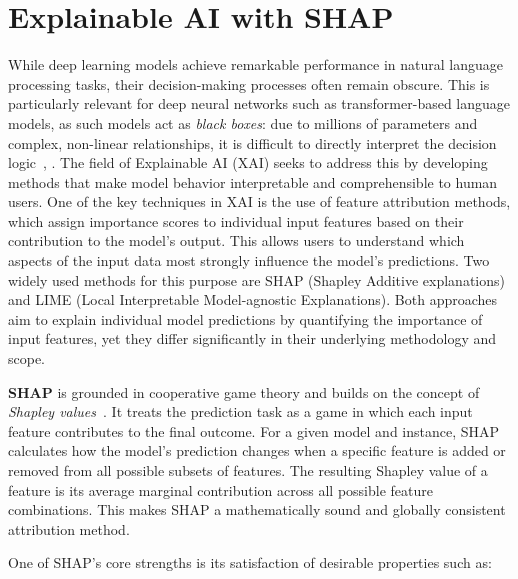 \section{Explainable AI with SHAP}

While deep learning models achieve remarkable performance in natural language processing tasks, their decision-making processes often remain obscure. This is particularly relevant for deep neural networks such as transformer-based language models, as such models act as \emph{black boxes}: due to millions of parameters and complex, non-linear relationships, it is difficult to directly interpret the decision logic~\cite{bilal2025}, \cite{ali2022}. The field of Explainable AI (XAI) seeks to address this by developing methods that make model behavior interpretable and comprehensible to human users. %
One of the key techniques in XAI is the use of feature attribution methods, which assign importance scores to individual input features based on their contribution to the model's output. This allows users to understand which aspects of the input data most strongly influence the model's predictions. Two widely used methods for this purpose are SHAP (Shapley Additive explanations) and LIME (Local Interpretable Model-agnostic Explanations). Both approaches aim to explain individual model predictions by quantifying the importance of input features, yet they differ significantly in their underlying methodology and scope.

\textbf{SHAP} is grounded in cooperative game theory and builds on the concept of \emph{Shapley values}~\cite{lundberg2017shap}. It treats the prediction task as a game in which each input feature contributes to the final outcome. For a given model and instance, SHAP calculates how the model's prediction changes when a specific feature is added or removed from all possible subsets of features. The resulting Shapley value of a feature is its average marginal contribution across all possible feature combinations. This makes SHAP a mathematically sound and globally consistent attribution method.

One of SHAP's core strengths is its satisfaction of desirable properties such as:

